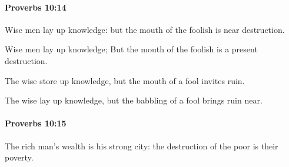 		\paragraph{Proverbs 10:14} %
			\label{PROVERBS-10-14}

			Wise men lay up knowledge: but the mouth of the foolish is near destruction.

			\begin{versebox}
					\item[BHS] 
					\item[ASV] Wise men lay up knowledge; But the mouth of the foolish is a present destruction.
					\item[NIV] The wise store up knowledge, but the mouth of a fool invites ruin.
					\item[NRSV] The wise lay up knowledge, but the babbling of a fool brings ruin near.
			\end{versebox}

		\paragraph{Proverbs 10:15} %
			\label{PROVERBS-10-15}

			The rich man’s wealth is his strong city: the destruction of the poor is their poverty.

